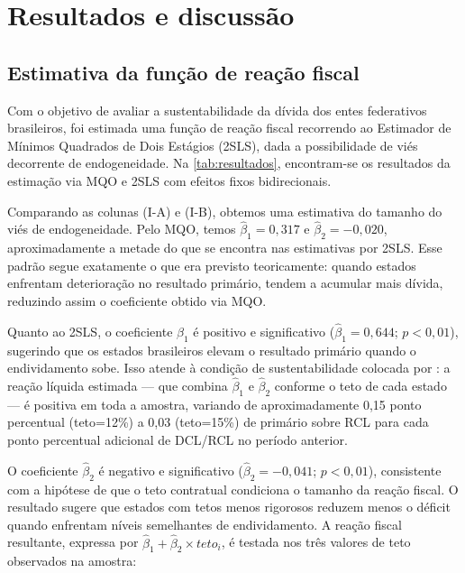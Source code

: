 \chapter{Resultados e discussão}
\label{chap:resultados}

\section{Estimativa da função de reação fiscal}

Com o objetivo de avaliar a sustentabilidade da dívida dos entes federativos brasileiros, foi estimada uma função de reação fiscal recorrendo ao Estimador de Mínimos Quadrados de Dois Estágios (2SLS), dada a possibilidade de viés decorrente de endogeneidade. Na \autoref{tab:resultados}, encontram-se os resultados da estimação via MQO e 2SLS com efeitos fixos bidirecionais.



Comparando as colunas (I-A) e (I-B), obtemos uma estimativa do tamanho do viés de endogeneidade. Pelo MQO, temos $\hat{\beta}_1 = 0{,}317$ e $\hat{\beta}_2 = -0{,}020$, aproximadamente a metade do que se encontra nas estimativas por 2SLS. Esse padrão segue exatamente o que era previsto teoricamente: quando estados enfrentam deterioração no resultado primário, tendem a acumular mais dívida, reduzindo assim o coeficiente obtido via MQO.

Quanto ao 2SLS, o coeficiente $\hat{\beta}_1$ é positivo e significativo ($\hat{\beta}_1 = 0{,}644$; $p < 0{,}01$), sugerindo que os estados brasileiros elevam o resultado primário quando o endividamento sobe. Isso atende à condição de sustentabilidade colocada por : a reação líquida estimada --- que combina $\hat\beta_1$ e $\hat\beta_2$ conforme o teto de cada estado --- é positiva em toda a amostra, variando de aproximadamente 0,15 ponto percentual (teto=12\%) a 0,03 (teto=15\%) de primário sobre RCL para cada ponto percentual adicional de DCL/RCL no período anterior.

O coeficiente $\hat{\beta}_2$ é negativo e significativo ($\hat{\beta}_2 = -0{,}041$; $p < 0{,}01$), consistente com a hipótese de que o teto contratual condiciona o tamanho da reação fiscal. O resultado sugere que estados com tetos menos rigorosos reduzem menos o déficit quando enfrentam níveis semelhantes de endividamento. A reação fiscal resultante, expressa por $\hat{\beta}_1 + \hat{\beta}_2 \times teto_i$, é testada nos três valores de teto observados na amostra:

